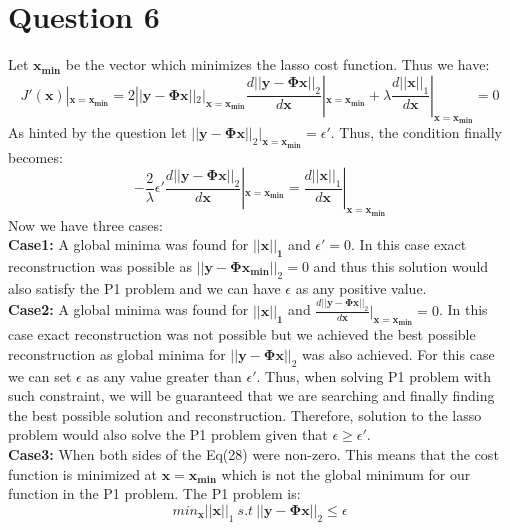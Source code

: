 \documentclass[12pt]{article}
\begin{document}
\section*{Question 6}
Let $\boldsymbol{x_{min}}$ be the vector which minimizes the lasso cost function. Thus we have:
\begin{equation*}
    J'(\boldsymbol{x})|_{\boldsymbol{x = x_{min}}} = 2||\boldsymbol{y-\Phi x}||_2|_{\boldsymbol{x = x_{min}}}\frac{d||\boldsymbol{y-\Phi x}||_2}{d\boldsymbol{x}}|_{\boldsymbol{x = x_{min}}}+\lambda\frac{d||\boldsymbol{x}||_1}{d\boldsymbol{x}}|_{\boldsymbol{x = x_{min}}}=0
\end{equation*}
As hinted by the question let $||\boldsymbol{y-\Phi x}||_2|_{\boldsymbol{x = x_{min}}} = \epsilon'$. Thus, the condition finally becomes:
\begin{equation}
    -\frac{2}{\lambda}\epsilon'\frac{d||\boldsymbol{y-\Phi x}||_2}{d\boldsymbol{x}}|_{\boldsymbol{x = x_{min}}} = \frac{d||\boldsymbol{x}||_1}{d\boldsymbol{x}}|_{\boldsymbol{x = x_{min}}}
\end{equation}
Now we have three cases:\\
\textbf{Case1:} A global minima was found for $\boldsymbol{||x||_1}$ and $\epsilon' = 0$. In this case exact reconstruction was possible as $||\boldsymbol{y-\Phi x_{min}}||_2 = 0$ and thus this solution would also satisfy the P1 problem and we can have $\epsilon$ as any positive value. \\
\textbf{Case2:} A global minima was found for $\boldsymbol{||x||_1}$ and $\frac{d||\boldsymbol{y-\Phi x}||_2}{d\boldsymbol{x}}|_{\boldsymbol{x = x_{min}}} = 0$. In this case exact reconstruction was not possible but we achieved the best possible reconstruction as global minima for $||\boldsymbol{y-\Phi x}||_2$ was also achieved. For this case we can set $\epsilon$ as any value greater than $\epsilon'$. Thus, when solving P1 problem with such constraint, we will be guaranteed that we are searching and finally finding the best possible solution and reconstruction. Therefore, solution to the lasso problem would also solve the P1 problem given that $\epsilon \geq \epsilon'$. \\
\textbf{Case3:} When both sides of the Eq(28) were non-zero. This means that the cost function is minimized at $\boldsymbol{x = x_{min}}$ which is not the global minimum for our function in the P1 problem. The P1 problem is:
\begin{equation*}
    min_{\boldsymbol{x}}||\boldsymbol{x}||_1 \ s.t\ ||\boldsymbol{y-\Phi x}||_2 \leq \epsilon
\end{equation*}
\end{document}
